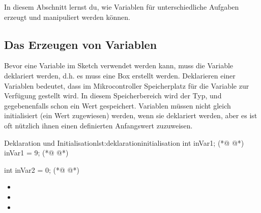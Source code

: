 In diesem Abschnitt lernst du, wie Variablen für unterschiedliche Aufgaben erzeugt und manipuliert werden können.

\subsection{Das Erzeugen von Variablen}

Bevor eine Variable im Sketch verwendet werden kann, muss die Variable deklariert werden, d.h. es muss eine Box erstellt werden.  Deklarieren einer Variablen bedeutet, dass im Mikrocontroller Speicherplatz für die Variable zur Verfügung gestellt wird. In diesem Speicherbereich wird der Typ, und gegebenenfalls schon ein Wert gespeichert.  Variablen müssen nicht gleich initialisiert (ein Wert zugewiesen) werden, wenn sie deklariert werden, aber es ist oft nützlich ihnen einen definierten Anfangswert zuzuweisen.

\begin{multicols}{2}
\null\vfill 
\begin{arduinoCode}{Deklaration und Initialisation}{lst:deklarationinitialisation}
 int inVar1; (*@  @*)
 inVar1 = 9; (*@  @*)
  
 int inVar2 = 0; (*@  @*)
\end{arduinoCode}
\vfill\null 
\columnbreak

\null\vfill
\begin{itemize}
  \itemsep15pt
  \item[] 
  \item[] 

  \item[] 
\end{itemize}
\vfill \null



\end{multicols}

